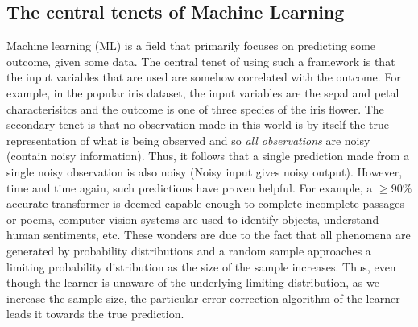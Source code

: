 \documentclass[12pt, letterpaper]{article}
\begin{document}
\subsection{The central tenets of Machine Learning}
\label{sec: The central tenets of Machine Learning}
Machine learning (ML) is a field that primarily focuses on predicting some
outcome, given some data. The central tenet of using such a framework is that
the input variables that are used are somehow correlated with the outcome. For
example, in the popular iris dataset, the input variables are the sepal and
petal characterisitcs and the outcome is one of three species of the iris
flower. The secondary tenet is that no observation made in this world is by
itself the true representation of what is being observed and so \textit{all
observations} are noisy (contain noisy information). Thus, it follows that a
single prediction made from a single noisy observation is also noisy (Noisy
input gives noisy output). However, time and time again, such predictions have
proven helpful. For example, a $\geq90\%$ accurate transformer is deemed capable
enough to complete incomplete passages or poems, computer vision systems are
used to identify objects, understand human sentiments, etc. These wonders are
due to the fact that all phenomena are generated by probability distributions
and a random sample approaches a limiting probability distribution as the size
of the sample increases. Thus, even though the learner is unaware of the
underlying limiting distribution, as we increase the sample size, the particular
error-correction algorithm of the learner leads it towards the true prediction. 
\end{document}

